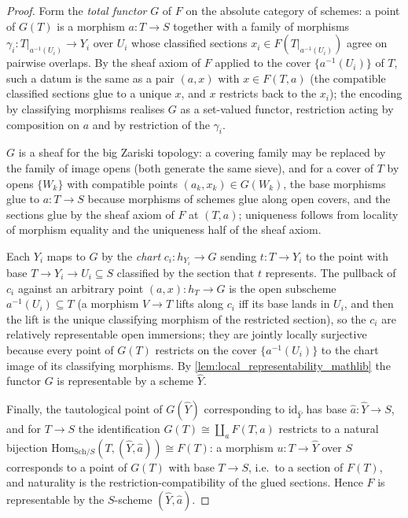 \begin{proof}\leanok
  Form the \emph{total functor} \(G\) of \(F\) on the absolute category of
  schemes: a point of \(G(T)\) is a morphism \(a : T \to S\) together with
  a family of morphisms \(\gamma_i : T|_{a^{-1}(U_i)} \to Y_i\) over
  \(U_i\) whose classified sections
  \(x_i \in F(T|_{a^{-1}(U_i)})\) agree on pairwise overlaps.  By the
  sheaf axiom of \(F\) applied to the cover \(\{a^{-1}(U_i)\}\) of \(T\),
  such a datum is the same as a pair \((a, x)\) with \(x \in F(T, a)\)
  (the compatible classified sections glue to a unique \(x\), and \(x\)
  restricts back to the \(x_i\)); the encoding by classifying morphisms
  realises \(G\) as a set-valued functor, restriction acting by composition
  on \(a\) and by restriction of the \(\gamma_i\).

  \(G\) is a sheaf for the big Zariski topology: a covering family may be
  replaced by the family of image opens (both generate the same sieve), and
  for a cover of \(T\) by opens \(\{W_k\}\) with compatible points
  \((a_k, x_k) \in G(W_k)\), the base morphisms glue to \(a : T \to S\)
  because morphisms of schemes glue along open covers, and the sections
  glue by the sheaf axiom of \(F\) at \((T, a)\); uniqueness follows from
  locality of morphism equality and the uniqueness half of the sheaf axiom.

  Each \(Y_i\) maps to \(G\) by the \emph{chart}
  \(c_i : h_{Y_i} \to G\) sending \(t : T \to Y_i\) to the point with
  base \(T \to Y_i \to U_i \subseteq S\) classified by the section that
  \(t\) represents.  The pullback of \(c_i\) against an arbitrary point
  \((a, x) : h_T \to G\) is the open subscheme \(a^{-1}(U_i) \subseteq T\)
  (a morphism \(V \to T\) lifts along \(c_i\) iff its base lands in
  \(U_i\), and then the lift is the unique classifying morphism of the
  restricted section), so the \(c_i\) are relatively representable open
  immersions; they are jointly locally surjective because every point of
  \(G(T)\) restricts on the cover \(\{a^{-1}(U_i)\}\) to the chart image
  of its classifying morphisms.  By
  \cref{lem:local_representability_mathlib} the functor \(G\) is
  representable by a scheme \(\hat{Y}\).

  Finally, the tautological point of \(G(\hat{Y})\) corresponding to
  \(\mathrm{id}_{\hat{Y}}\) has base \(\hat{a} : \hat{Y} \to S\), and for
  \(T \to S\) the identification \(G(T) \cong \coprod_{a} F(T, a)\)
  restricts to a natural bijection
  \(\mathrm{Hom}_{\mathrm{Sch}/S}(T, (\hat{Y}, \hat{a})) \cong F(T)\):
  a morphism \(u : T \to \hat{Y}\) over \(S\) corresponds to a point of
  \(G(T)\) with base \(T \to S\), i.e.\ to a section of \(F(T)\), and
  naturality is the restriction-compatibility of the glued sections.  Hence
  \(F\) is representable by the \(S\)-scheme \((\hat{Y}, \hat{a})\).
\end{proof}

